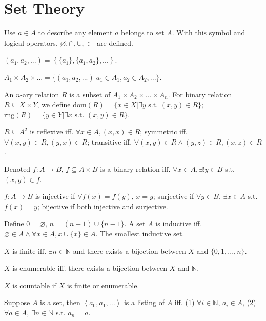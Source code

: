 \documentclass{article}
\newcommand \mlist[1]				{\left\langle #1 \right\rangle}
\newcommand \ran[1]					{\text{rng}\left( #1 \right)}
\newcommand \dom[1]					{\text{dom}\left( #1 \right)}
\begin{document}
\QED


\section{Set Theory}

Use $a \in A$ to describe any element $a$ belongs to set $A$. With this symbol and logical operators, $\varnothing, \cap, \cup, \subset$ are defined.

	$(a_1,a_2,...)=\left\{ \{a_1\}, \{a_1,a_2\}, ... \right\}$.
	
	$A_1\times A_2 \times ... = \{(a_1,a_2,...)| a_1\in A_1, a_2\in A_2,...\}$.

	An $n$-ary relation $R$ is a subset of $A_1\times A_2 \times ... \times A_n$. For binary relation $R \subseteq X \times Y$, we define $\dom{R}=\{x\in X | \exists y \text{ s.t. } (x,y) \in R\}$; $\ran{R}=\{y\in Y| \exists x \text{ s.t. } (x,y) \in R\}$.

	$R \subseteq A^2$ is reflexive iff. $\forall x \in A, (x,x) \in R$; symmetric iff. $\forall (x,y) \in R, (y,x)\in R$; transitive iff. $\forall (x,y) \in R \land (y,z) \in R, (x,z)\in R$.

	Denoted $f:A\to B$, $f \subseteq A\times B$ is a binary relation iff. $\forall x \in A, \exists! y \in B$ s.t. $(x,y)\in f$.

	$f:A\to B$ is injective if $\forall f(x)=f(y)$, $x=y$; surjective if $\forall y \in B$, $\exists x \in A$ s.t. $f(x)=y$; bijective if both injective and surjective.

	Define $0=\varnothing$, $n=(n-1) \cup \{ n-1 \}$.
	A set $A$ is inductive iff. $\varnothing \in A \land \forall x\in A, x \cup \{x\} \in A$.
	The smallest inductive set.

	$X$ is finite iff. $\exists n \in \mathbb{N}$ and there exists a bijection between $X$ and $\{0,1,...,n\}$.

	$X$ is enumerable iff. there exists a bijection between $X$ and $\mathbb{N}$.

	$X$ is countable if $X$ is finite or enumerable.

	Suppose $A$ is a set, then $\mlist{a_0,a_1,...}$ is a listing of $A$ iff. (1) $\forall i \in \mathbb{N}$, $a_i \in A$, (2) $\forall a \in A$, $\exists n\in \mathbb{N}$ s.t. $a_n=a$.
\end{document}
